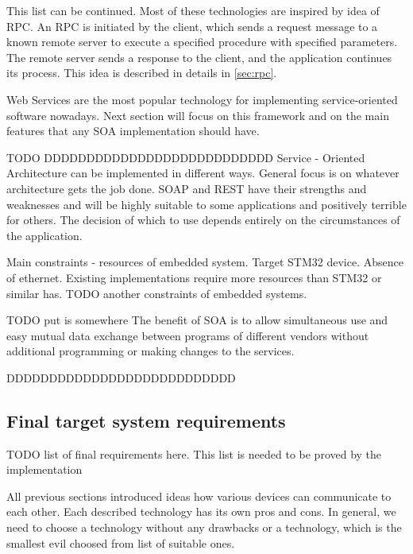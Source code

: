 This list can be continued. Most of these technologies are inspired by idea
of \gls{RPC}. An \gls{RPC} is initiated by the client, which sends a request
message to a known remote server to execute a specified procedure with specified
parameters. The remote server sends a response to the client, and the application continues its process.
This idea is described in details in \autoref{sec:rpc}.



Web Services are the most popular technology for implementing
service-oriented software nowadays. Next section will focus on this framework
and on the main features that any \gls{SOA} implementation should have.







TODO DDDDDDDDDDDDDDDDDDDDDDDDDDD
Service
-
Oriented Architecture can be implemented in different ways. General focus is on
whatever architecture gets the job done. SOAP and REST have their strengths and weaknesses
and will be highly suitable to some
applications and positively terrible for others. The decision of
which to use depends entirely on the circumstances of the application.






Main constraints - resources of embedded system.
Target STM32 device.
Absence of ethernet.
Existing implementations require more resources than STM32 or similar has.
TODO another constraints of embedded systems.

TODO put is somewhere
 The benefit of SOA is
to allow simultaneous use and easy mutual data exchange between programs of different vendors without additional programming or making changes to the services.
 

DDDDDDDDDDDDDDDDDDDDDDDDDDD








\subsection{Final target system requirements}
TODO list of final requirements here. This list is needed to be proved by the
implementation

All previous sections introduced ideas how various devices can communicate to
each other. Each described technology has its own pros and cons. In general, we
need to choose a technology without any drawbacks or a technology, which is the
smallest evil choosed from list of suitable ones.


